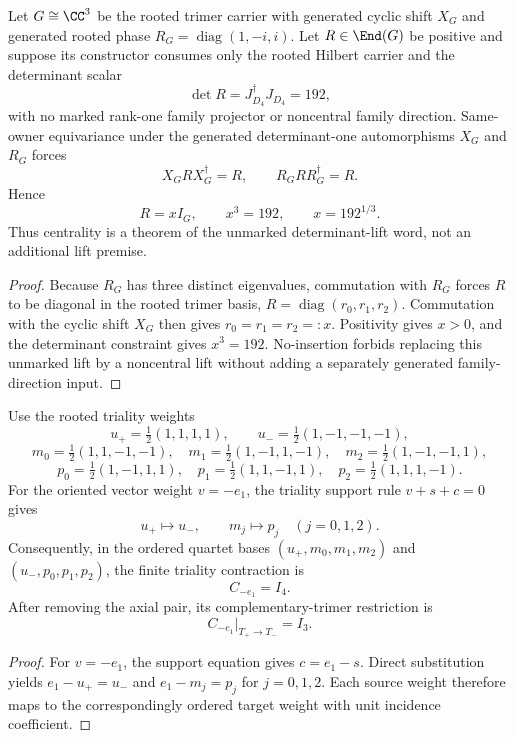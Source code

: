 \documentclass[11pt]{article}
\begin{document}
\begin{theorem}
\label{p1:thm:v562-natural-rooted-determinant-lift}
Let \(G\cong\CC^3\) be the rooted trimer carrier with generated cyclic shift
\(X_G\) and generated rooted phase \(R_G=\operatorname{diag}(1,-i,i)\).  Let
\(R\in\End(G)\) be positive and suppose its constructor consumes only the
rooted Hilbert carrier and the determinant scalar
\[
 \det R=J_{D_4}^{\dagger}J_{D_4}=192,
\]
with no marked rank-one family projector or noncentral family direction.
Same-owner equivariance under the generated determinant-one automorphisms
\(X_G\) and \(R_G\) forces
\[
 X_GRX_G^\dagger=R,
 \qquad
 R_GRR_G^\dagger=R.
\]
Hence
\[
 \boxed{R=xI_G,\qquad x^3=192,\qquad x=192^{1/3}.}
\]
Thus centrality is a theorem of the unmarked determinant-lift word, not an
additional lift premise.
\end{theorem}

\begin{proof}
Because \(R_G\) has three distinct eigenvalues, commutation with \(R_G\)
forces \(R\) to be diagonal in the rooted trimer basis,
\(R=\operatorname{diag}(r_0,r_1,r_2)\).  Commutation with the cyclic shift
\(X_G\) then gives \(r_0=r_1=r_2=:x\).  Positivity gives \(x>0\), and the
determinant constraint gives \(x^3=192\).  No-insertion forbids replacing
this unmarked lift by a noncentral lift without adding a separately generated
family-direction input.
\end{proof}

\begin{theorem}
\label{p1:thm:v562-axial-triality-trimer-identity}
Use the rooted triality weights
\[
 u_+=\tfrac12(1,1,1,1),\qquad
 u_-=\tfrac12(1,-1,-1,-1),
\]
\[
 m_0=\tfrac12(1,1,-1,-1),\quad
 m_1=\tfrac12(1,-1,1,-1),\quad
 m_2=\tfrac12(1,-1,-1,1),
\]
\[
 p_0=\tfrac12(1,-1,1,1),\quad
 p_1=\tfrac12(1,1,-1,1),\quad
 p_2=\tfrac12(1,1,1,-1).
\]
For the oriented vector weight \(v=-e_1\), the triality support rule
\(v+s+c=0\) gives
\[
 u_+\mapsto u_-,\qquad m_j\mapsto p_j\quad(j=0,1,2).
\]
Consequently, in the ordered quartet bases
\((u_+,m_0,m_1,m_2)\) and \((u_-,p_0,p_1,p_2)\), the finite triality
contraction is
\[
 \boxed{C_{-e_1}=I_4.}
\]
After removing the axial pair, its complementary-trimer restriction is
\[
 \boxed{C_{-e_1}|_{T_+\to T_-}=I_3.}
\]
\end{theorem}

\begin{proof}
For \(v=-e_1\), the support equation gives \(c=e_1-s\).  Direct substitution
yields \(e_1-u_+=u_-\) and \(e_1-m_j=p_j\) for \(j=0,1,2\).  Each source
weight therefore maps to the correspondingly ordered target weight with unit
incidence coefficient.
\end{proof}
\end{document}
